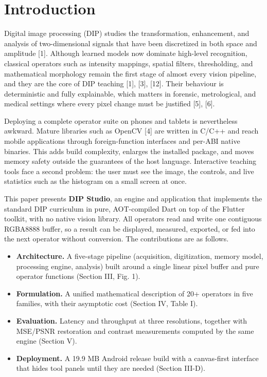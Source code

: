 \documentclass[journal]{IEEEtran}
\begin{document}
\section{Introduction}
\label{sec:intro}
Digital image processing (DIP) studies the transformation, enhancement, and analysis of two-dimensional signals that have been discretized in both space and amplitude [1]. Although learned models now dominate high-level recognition, classical operators such as intensity mappings, spatial filters, thresholding, and mathematical morphology remain the first stage of almost every vision pipeline, and they are the core of DIP teaching [1], [3], [12]. Their behaviour is deterministic and fully explainable, which matters in forensic, metrological, and medical settings where every pixel change must be justified [5], [6].

Deploying a complete operator suite on phones and tablets is nevertheless awkward. Mature libraries such as OpenCV [4] are written in C/C++ and reach mobile applications through foreign-function interfaces and per-ABI native binaries. This adds build complexity, enlarges the installed package, and moves memory safety outside the guarantees of the host language. Interactive teaching tools face a second problem: the user must see the image, the controls, and live statistics such as the histogram on a small screen at once.

This paper presents \textbf{DIP Studio}, an engine and application that implements the standard DIP curriculum in pure, AOT-compiled Dart on top of the Flutter toolkit, with no native vision library. All operators read and write one contiguous RGBA8888 buffer, so a result can be displayed, measured, exported, or fed into the next operator without conversion. The contributions are as follows.

\begin{itemize}
  \item \textbf{Architecture.} A five-stage pipeline (acquisition, digitization, memory model, processing engine, analysis) built around a single linear pixel buffer and pure operator functions (Section III, Fig. 1).
  \item \textbf{Formulation.} A unified mathematical description of 20+ operators in five families, with their asymptotic cost (Section IV, Table I).
  \item \textbf{Evaluation.} Latency and throughput at three resolutions, together with MSE/PSNR restoration and contrast measurements computed by the same engine (Section V).
  \item \textbf{Deployment.} A 19.9 MB Android release build with a canvas-first interface that hides tool panels until they are needed (Section III-D).
\end{itemize}
\end{document}
